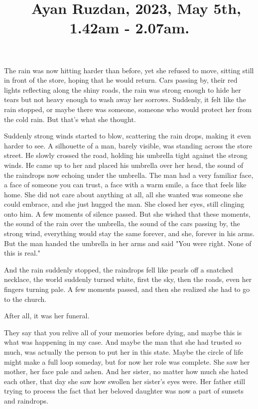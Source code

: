 \documentclass[a4paper, 10pt]{article}
\title{~ Ayan Ruzdan, 2023, May 5th, 1.42am - 2.07am.}
\date{}
\begin{document}
\maketitle
The rain was now hitting harder than before, yet she refused to move, sitting still in front of the store, hoping that he would return. Cars passing by, their red lights reflecting along the shiny roads, the rain was strong enough to hide her tears but not heavy enough to wash away her sorrows. Suddenly, it felt like the rain stopped, or maybe there was someone, someone who would protect her from the cold rain. But that's what she thought.

Suddenly strong winds started to blow, scattering the rain drops, making it even harder to see. A silhouette of a man, barely visible, was standing across the store street. He slowly crossed the road, holding his umbrella tight against the strong winds. He came up to her and placed his umbrella over her head, the sound of the raindrops now echoing under the umbrella. The man had a very familiar face, a face of someone you can trust, a face with a warm smile, a face that feels like home. She did not care about anything at all, all she wanted was someone she could embrace, and she just hugged the man. She closed her eyes, still clinging onto him. A few moments of silence passed. But she wished that these moments, the sound of the rain over the umbrella, the sound of the cars passing by, the strong wind, everything would stay the same forever, and she, forever in his arms. But the man handed the umbrella in her arms and said "You were right. None of this is real."

And the rain suddenly stopped, the raindrops fell like pearls off a snatched necklace, the world suddenly turned white, first the sky, then the roads, even her fingers turning pale. A few moments passed, and then she realized she had to go to the church.

After all, it was her funeral.

They say that you relive all of your memories before dying, and maybe this is what was happening in my case. And maybe the man that she had trusted so much, was actually the person to put her in this state. Maybe the circle of life might make a full loop someday, but for now her role was complete. She saw her mother, her face pale and ashen. And her sister, no matter how much she hated each other, that day she saw how swollen her sister's eyes were. Her father still trying to process the fact that her beloved daughter was now a part of sunsets and raindrops.
\end{document}
